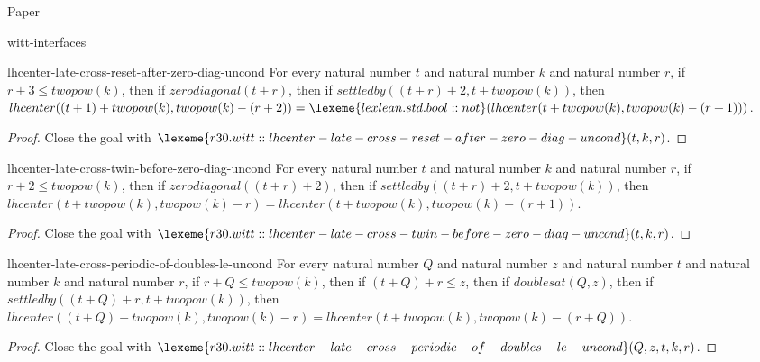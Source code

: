 \begin{lexlean}{Paper}
\begin{section}{witt-interfaces}
  \begin{theorem}{lhcenter-late-cross-reset-after-zero-diag-uncond}
  For every natural number \(t\) and natural number \(k\) and natural number \(r\), if \(r + 3 ≤ twopow(k)\), then if \(zerodiagonal(t + r)\), then if \(settledby((t + r) + 2, t + twopow(k))\), then \(lhcenter((t + 1) + twopow(k), twopow(k) - (r + 2)) = \lexeme{lexlean.std.bool::not}(lhcenter(t + twopow(k), twopow(k) - (r + 1)))\).
  \begin{proof}
  Close the goal with \(\lexeme{r30.witt::lhcenter-late-cross-reset-after-zero-diag-uncond}(t, k, r)\).
  \end{proof}
  \end{theorem}

  \begin{theorem}{lhcenter-late-cross-twin-before-zero-diag-uncond}
  For every natural number \(t\) and natural number \(k\) and natural number \(r\), if \(r + 2 ≤ twopow(k)\), then if \(zerodiagonal((t + r) + 2)\), then if \(settledby((t + r) + 2, t + twopow(k))\), then \(lhcenter(t + twopow(k), twopow(k) - r) = lhcenter(t + twopow(k), twopow(k) - (r + 1))\).
  \begin{proof}
  Close the goal with \(\lexeme{r30.witt::lhcenter-late-cross-twin-before-zero-diag-uncond}(t, k, r)\).
  \end{proof}
  \end{theorem}

  \begin{theorem}{lhcenter-late-cross-periodic-of-doubles-le-uncond}
  For every natural number \(Q\) and natural number \(z\) and natural number \(t\) and natural number \(k\) and natural number \(r\), if \(r + Q ≤ twopow(k)\), then if \((t + Q) + r ≤ z\), then if \(doublesat(Q, z)\), then if \(settledby((t + Q) + r, t + twopow(k))\), then \(lhcenter((t + Q) + twopow(k), twopow(k) - r) = lhcenter(t + twopow(k), twopow(k) - (r + Q))\).
  \begin{proof}
  Close the goal with \(\lexeme{r30.witt::lhcenter-late-cross-periodic-of-doubles-le-uncond}(Q, z, t, k, r)\).
  \end{proof}
  \end{theorem}


\end{section}
\end{lexlean}
